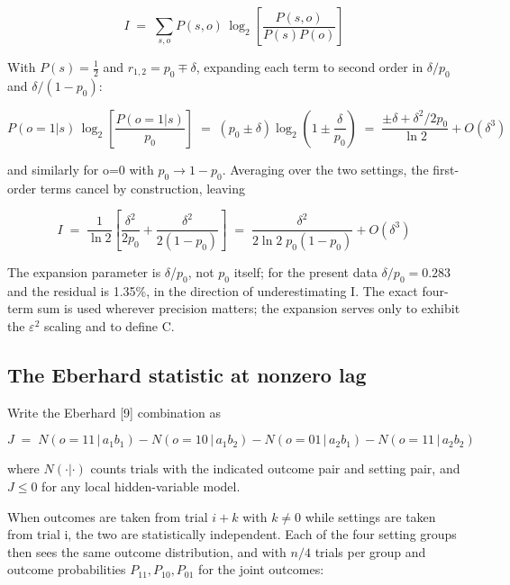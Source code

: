 \documentclass[
  11pt,
]{article}
\begin{document}
\begin{equation}
I \;=\; \sum_{s,o} P(s,o)\,\log_2\!\left[\frac{P(s,o)}{P(s)P(o)}\right]
\label{eq:mi-def}
\end{equation}

With \(P(s) = \tfrac12\) and \(r_{1,2} = p_0 \mp \delta\), expanding
each term to second order in \(\delta/p_0\) and \(\delta/(1-p_0)\):

\begin{equation}
P(o{=}1|s)\,\log_2\!\left[\frac{P(o{=}1|s)}{p_0}\right] \;=\; (p_0 \pm \delta)\log_2\!\left(1 \pm \frac{\delta}{p_0}\right) \;=\; \frac{\pm\delta + \delta^2/2p_0}{\ln 2} + O(\delta^3)
\label{eq:expansion}
\end{equation}

and similarly for o=0 with \(p_0 \to 1-p_0\). Averaging over the two
settings, the first-order terms cancel by construction, leaving

\begin{equation}
I \;=\; \frac{1}{\ln 2}\left[\frac{\delta^2}{2p_0} + \frac{\delta^2}{2(1-p_0)}\right] \;=\; \frac{\delta^2}{2\ln 2\; p_0(1-p_0)} + O(\delta^3)
\label{eq:expansion2}
\end{equation}

The expansion parameter is \(\delta\)/\(p_{0}\), not \(p_{0}\) itself;
for the present data \(\delta/p_0 = 0.283\) and the residual is 1.35\%,
in the direction of underestimating I. The exact four-term sum is used
wherever precision matters; the expansion serves only to exhibit the
\(\varepsilon^{2}\) scaling and to define C.

\subsection{The Eberhard statistic at nonzero lag}

Write the Eberhard {[}9{]} combination as

\begin{equation}
J \;=\; N(o{=}11\,|\,a_1b_1) - N(o{=}10\,|\,a_1b_2) - N(o{=}01\,|\,a_2b_1) - N(o{=}11\,|\,a_2b_2)
\label{eq:eberhard2}
\end{equation}

where \(N(\cdot|\cdot)\) counts trials with the indicated outcome pair
and setting pair, and \(J \le 0\) for any local hidden-variable model.

When outcomes are taken from trial \(i+k\) with \(k \ne 0\) while
settings are taken from trial i, the two are statistically independent.
Each of the four setting groups then sees the same outcome distribution,
and with \(n/4\) trials per group and outcome probabilities
\(P_{11}, P_{10}, P_{01}\) for the joint outcomes:
\end{document}
